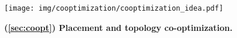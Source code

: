 \begin{figure}[H]
\vspace{-1em}
\centering
\captionsetup{justification=centering}
\texttt{[image: img/cooptimization/cooptimization\_idea.pdf]}
\caption{\textbf{(\textsection\ref{sec:coopt}) Placement and topology co-optimization.}}
\label{fig:coopt-idea}
\vspace{-0.5em}
\end{figure}
